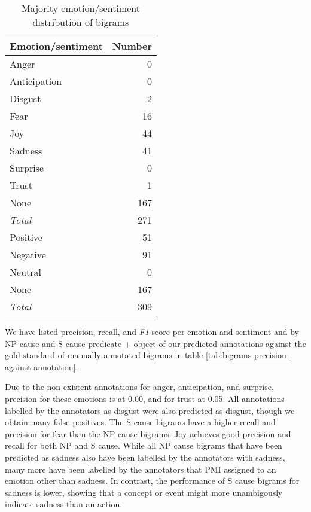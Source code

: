 \begin{table}
\centering
\begin{tabular}{l|r}
\textbf{Emotion/sentiment} & \textbf{Number}\\\hline
Anger & 0\\
Anticipation & 0\\
Disgust & 2\\
Fear & 16\\
Joy & 44\\
Sadness & 41\\
Surprise & 0\\
Trust & 1\\
None & 167 \\\hline
\textit{Total} & 271\\\hline
Positive & 51\\
Negative & 91\\
Neutral & 0\\
None & 167\\\hline
\textit{Total} & 309
\end{tabular}
\caption{Majority emotion/sentiment distribution of bigrams}
\label{tab:bigrams-majority-number-emotion-sentiment}
\end{table}

We have listed precision, recall, and \textit{F1} score per emotion and sentiment and by NP cause and S cause predicate + object of our predicted annotations against the gold standard of manually annotated bigrams in table \ref{tab:bigrams-precision-against-annotation}.

Due to the non-existent annotations for anger, anticipation, and surprise, precision for these emotions is at 0.00, and for trust at 0.05. All annotations labelled by the annotators as disgust were also predicted as disgust, though we obtain many false positives. The S cause bigrams have a higher recall and precision for fear than the NP cause bigrams. Joy achieves good precision and recall for both NP and S cause. While all NP cause bigrams that have been predicted as sadness also have been labelled by the annotators with sadness, many more have been labelled by the annotators that PMI assigned to an emotion other than sadness. In contrast, the performance of S cause bigrams for sadness is lower, showing that a concept or event might more unambigously indicate sadness than an action.

